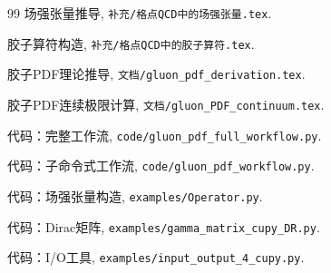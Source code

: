 \documentclass[12pt,a4paper]{ctexart}
\theoremstyle{definition}
\begin{document}
\begin{thebibliography}{99}
场强张量推导,
\texttt{补充/格点QCD中的场强张量.tex}.

胶子算符构造,
\texttt{补充/格点QCD中的胶子算符.tex}.

胶子PDF理论推导,
\texttt{文档/gluon\_pdf\_derivation.tex}.

胶子PDF连续极限计算,
\texttt{文档/gluon\_PDF\_continuum.tex}.

代码：完整工作流,
\texttt{code/gluon\_pdf\_full\_workflow.py}.

代码：子命令式工作流,
\texttt{code/gluon\_pdf\_workflow.py}.

代码：场强张量构造,
\texttt{examples/Operator.py}.

代码：Dirac矩阵,
\texttt{examples/gamma\_matrix\_cupy\_DR.py}.

代码：I/O工具,
\texttt{examples/input\_output\_4\_cupy.py}.

\end{thebibliography}
\end{document}
